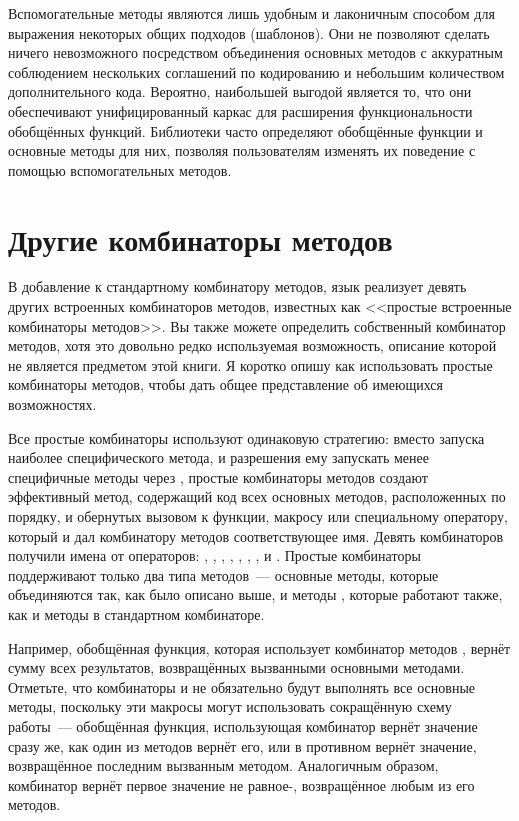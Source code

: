 Вспомогательные методы являются лишь удобным и лаконичным способом для выражения некоторых
общих подходов (шаблонов).  Они не позволяют сделать ничего невозможного посредством
объединения основных методов с аккуратным соблюдением нескольких соглашений по кодированию
и небольшим количеством дополнительного кода. Вероятно, наибольшей выгодой является то,
что они обеспечивают унифицированный каркас для расширения функциональности обобщённых
функций.  Библиотеки часто определяют обобщённые функции и основные методы для них,
позволяя пользователям изменять их поведение с помощью вспомогательных методов.

\section{Другие комбинаторы методов}

В добавление к стандартному комбинатору методов, язык реализует девять других встроенных
комбинаторов методов, известных как <<простые встроенные комбинаторы методов>>.  Вы также
можете определить собственный комбинатор методов, хотя это довольно редко используемая
возможность, описание которой не является предметом этой книги.  Я коротко опишу как
использовать простые комбинаторы методов, чтобы дать общее представление об имеющихся
возможностях.

Все простые комбинаторы используют одинаковую стратегию: вместо запуска наиболее
специфического метода, и разрешения ему запускать менее специфичные методы через
, простые комбинаторы методов создают эффективный метод, содержащий
код всех основных методов, расположенных по порядку, и обернутых вызовом к функции,
макросу или специальному оператору, который и дал комбинатору методов соответствующее имя.
Девять комбинаторов получили имена от операторов: \code{+}, , ,
, , , ,  и .  Простые
комбинаторы поддерживают только два типа методов~--- основные методы, которые объединяются
так, как было описано выше, и методы , которые работают также, как и методы
 в стандартном комбинаторе.

Например, обобщённая функция, которая использует комбинатор методов \code{+}, вернёт сумму
всех результатов, возвращённых вызванными основными методами.  Отметьте, что комбинаторы
 и  не обязательно будут выполнять все основные методы, поскольку эти
макросы могут использовать сокращённую схему работы~--- обобщённая функция, использующая
комбинатор  вернёт значение  сразу же, как один из методов вернёт его,
или в противном вернёт значение, возвращённое последним вызванным методом.  Аналогичным
образом, комбинатор  вернёт первое значение не равное-, возвращённое
любым из его методов.

